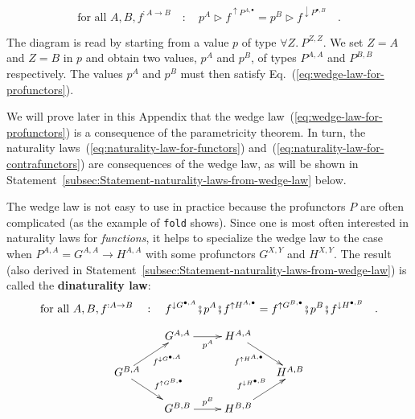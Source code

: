 \begin{equation}
\text{for all }A,B,f^{:A\rightarrow B}\quad:\quad p^{A}\triangleright f^{\uparrow P^{A,\bullet}}=p^{B}\triangleright f^{\downarrow P^{\bullet,B}}\quad.\label{eq:wedge-law-for-profunctors}
\end{equation}
\vspace{-0.8\baselineskip}

\noindent The diagram is read by starting from a value $p$ of type
$\forall Z.\:P^{Z,Z}$. We set $Z=A$ and $Z=B$ in $p$ and obtain
two values, $p^{A}$ and $p^{B}$, of types $P^{A,A}$ and $P^{B,B}$
respectively. The values $p^{A}$ and $p^{B}$ must then satisfy Eq.~(\ref{eq:wedge-law-for-profunctors}). 

We will prove later in this Appendix that the wedge law~(\ref{eq:wedge-law-for-profunctors})
is a consequence of the parametricity theorem. In turn, the naturality
laws~(\ref{eq:naturality-law-for-functors}) and~(\ref{eq:naturality-law-for-contrafunctors})
are consequences of the wedge law, as will be shown in Statement~\ref{subsec:Statement-naturality-laws-from-wedge-law}
below.

The wedge law is not easy to use in practice because the profunctors
$P$ are often complicated (as the example of \lstinline!fold! shows).
Since one is most often interested in naturality laws for \emph{functions},
it helps to specialize the wedge law to the case when $P^{A,A}=G^{A,A}\rightarrow H^{A,A}$
with some profunctors $G^{X,Y}$ and $H^{X,Y}$. The result (also
derived in Statement~\ref{subsec:Statement-naturality-laws-from-wedge-law})
is called the \textbf{dinaturality law}:
\begin{equation}
\text{for all }A,B,f^{:A\rightarrow B}\quad:\quad f^{\downarrow G^{\bullet,A}}\bef p^{A}\bef f^{\uparrow H^{A,\bullet}}=f^{\uparrow G^{B,\bullet}}\bef p^{B}\bef f^{\downarrow H^{\bullet,B}}\quad.\label{eq:dinaturality-law-for-profunctors}
\end{equation}

\begin{wrapfigure}{l}{0.38\columnwidth}%
\vspace{-2.25\baselineskip}
\[
\xymatrix{\xyScaleY{1.5pc}\xyScaleX{2.0pc} & G^{A,A}\ar[r]\sb(0.5){p^{A}} & H^{A,A}\ar[rd]\sb(0.4){f^{\uparrow H^{A,\bullet}}}\\
G^{B,A}\negthickspace\negthickspace\negthickspace\ar[rd]\sp(0.55){\;\;f^{\uparrow G^{B,\bullet}}}\ar[ru]\sb(0.6){f^{\downarrow G^{\bullet,A}}} &  &  & \negthickspace\negthickspace\negthickspace H^{A,B}\\
 & G^{B,B}\ar[r]\sp(0.5){p^{B}} & H^{B,B}\ar[ru]\sp(0.45){f^{\downarrow H^{\bullet,B}}}
}
\]

\vspace{-1.7\baselineskip}
\end{wrapfigure}%

